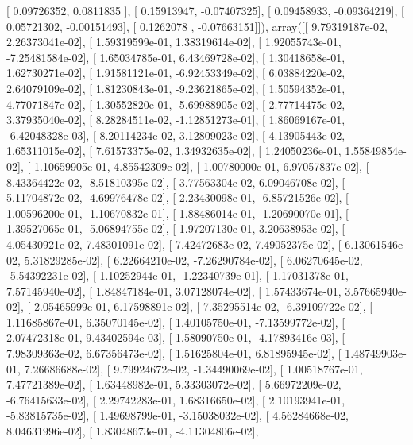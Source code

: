 \documentclass{article}
\begin{document}
       [ 0.09726352,  0.0811835 ],
       [ 0.15913947, -0.07407325],
       [ 0.09458933, -0.09364219],
       [ 0.05721302, -0.00151493],
       [ 0.1262078 , -0.07663151]]), array([[  9.79319187e-02,   2.26373041e-02],
       [  1.59319599e-01,   1.38319614e-02],
       [  1.92055743e-01,  -7.25481584e-02],
       [  1.65034785e-01,   6.43469728e-02],
       [  1.30418658e-01,   1.62730271e-02],
       [  1.91581121e-01,  -6.92453349e-02],
       [  6.03884220e-02,   2.64079109e-02],
       [  1.81230843e-01,  -9.23621865e-02],
       [  1.50594352e-01,   4.77071847e-02],
       [  1.30552820e-01,  -5.69988905e-02],
       [  2.77714475e-02,   3.37935040e-02],
       [  8.28284511e-02,  -1.12851273e-01],
       [  1.86069167e-01,  -6.42048328e-03],
       [  8.20114234e-02,   3.12809023e-02],
       [  4.13905443e-02,   1.65311015e-02],
       [  7.61573375e-02,   1.34932635e-02],
       [  1.24050236e-01,   1.55849854e-02],
       [  1.10659905e-01,   4.85542309e-02],
       [  1.00780000e-01,   6.97057837e-02],
       [  8.43364422e-02,  -8.51810395e-02],
       [  3.77563304e-02,   6.09046708e-02],
       [  5.11704872e-02,  -4.69976478e-02],
       [  2.23430098e-01,  -6.85721526e-02],
       [  1.00596200e-01,  -1.10670832e-01],
       [  1.88486014e-01,  -1.20690070e-01],
       [  1.39527065e-01,  -5.06894755e-02],
       [  1.97207130e-01,   3.20638953e-02],
       [  4.05430921e-02,   7.48301091e-02],
       [  7.42472683e-02,   7.49052375e-02],
       [  6.13061546e-02,   5.31829285e-02],
       [  6.22664210e-02,  -7.26290784e-02],
       [  6.06270645e-02,  -5.54392231e-02],
       [  1.10252944e-01,  -1.22340739e-01],
       [  1.17031378e-01,   7.57145940e-02],
       [  1.84847184e-01,   3.07128074e-02],
       [  1.57433674e-01,   3.57665940e-02],
       [  2.05465999e-01,   6.17598891e-02],
       [  7.35295514e-02,  -6.39109722e-02],
       [  1.11685867e-01,   6.35070145e-02],
       [  1.40105750e-01,  -7.13599772e-02],
       [  2.07472318e-01,   9.43402594e-03],
       [  1.58090750e-01,  -4.17893416e-03],
       [  7.98309363e-02,   6.67356473e-02],
       [  1.51625804e-01,   6.81895945e-02],
       [  1.48749903e-01,   7.26686688e-02],
       [  9.79924672e-02,  -1.34490069e-02],
       [  1.00518767e-01,   7.47721389e-02],
       [  1.63448982e-01,   5.33303072e-02],
       [  5.66972209e-02,  -6.76415633e-02],
       [  2.29742283e-01,   1.68316650e-02],
       [  2.10193941e-01,  -5.83815735e-02],
       [  1.49698799e-01,  -3.15038032e-02],
       [  4.56284668e-02,   8.04631996e-02],
       [  1.83048673e-01,  -4.11304806e-02],
\end{document}
